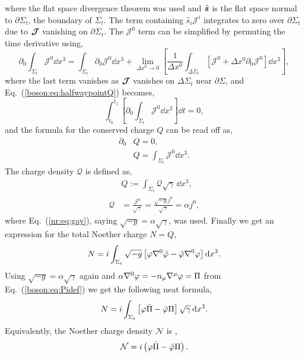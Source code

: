where the flat space divergence theorem was used and $\hat{\boldsymbol{s}}$ is the flat space normal to $\partial \Sigma_t$, the boundary of $\Sigma_t$. The term containing $\hat{s}_i\mathcal{J}^i$ integrates to zero over $\partial \Sigma_t$ due to $\boldsymbol{\mathcal{J}}$ vanishing on $\partial \Sigma_t$. The $\mathcal{J}^0$ term can be simplified by permuting the time derivative using,
\begin{equation} 
\partial_0 \int_{\Sigma_t}\mathcal{J}^0 \dd x^3 = \int_{\Sigma_t}\partial_0 \mathcal{J}^0 \dd x^3 + \lim_{\Delta x^0\rightarrow0}\left[ \frac{1}{\Delta x^0}\int_{\Delta \Sigma_t}\left[ \mathcal{J}^0 +\Delta x^0 \partial_0 \mathcal{J}^0\right] \dd x^3 \right],
\end{equation}
where the last term vanishes as $\boldsymbol{\mathcal{J}}$ vanishes on $\Delta \Sigma_t$ near $\partial\Sigma$, and Eq.~(\ref{boson:eq:halfwaypointQ}) becomes,
\begin{equation} 
\int^{t_1}_{t_0}\left[\partial_0 \int_{\Sigma_t} \mathcal{J}^0 \dd x^3 \right]\dd t = 0,
\end{equation} 
and the formula for the conserved charge $Q$ can be read off as,
\begin{align} 
\partial_0 &Q=0,\\
&Q = \int_{\Sigma_t}\mathcal{J}^0 \dd x^3 .
\end{align}
The charge density $\mathcal{Q}$ is defined as, 
\begin{align} 
&Q := \int_{\Sigma_t} \mathcal{Q}\sqrt{\gamma} \,\dd x^3 ,\\
\mathcal{Q}&= \frac{\mathcal{J}^0}{\sqrt{\gamma}} = \frac{\sqrt{-g}j^0}{\sqrt{\gamma}} = \alpha j^0,
\end{align}
where Eq.~(\ref{nr:eq:gay}), saying $\sqrt{-g}=\alpha\sqrt{\gamma}$, was used.
Finally we get an expression for the total Noether charge $N=Q$,
\begin{equation}
N =i \int_{\Sigma_t} \sqrt{-g}\left[ \varphi \nabla^0 \bar{\varphi} - \bar{\varphi}\nabla^0 \varphi\right] \dd x^3.
\end{equation}
Using $\sqrt{-g} = \alpha \sqrt{\gamma}$ again and $\alpha \nabla^0 \varphi = -n_\mu \nabla^\mu \varphi = \Pi$ from Eq.~(\ref{boson:eq:Pidef}) we get the following neat formula,
\begin{equation} 
N = i\int_{\Sigma_t}\left[ \varphi \bar{\Pi}-\bar{\varphi}\Pi\right] \sqrt{\gamma}\,\dd x^3.
\end{equation}
Equivalently, the Noether charge density $\mathcal{N}$ is ,
\begin{equation} 
\mathcal{N} = i\left( \varphi \bar{\Pi}-\bar{\varphi}\Pi\right) .
\end{equation}

